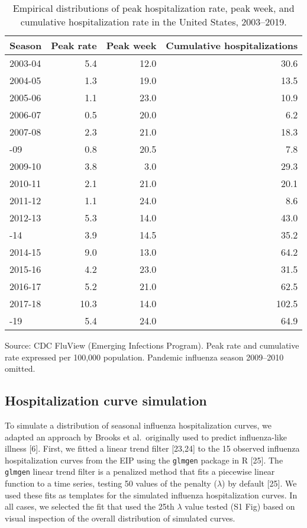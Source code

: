 \documentclass[10pt,letterpaper]{article}
\begin{document}
\begin{table}

\caption{\label{tab:target-table}Empirical distributions of peak hospitalization rate, peak week, and cumulative hospitalization rate in the United States, 2003--2019.}
\centering
\begin{threeparttable}
\begin{tabular}[t]{lrrr}
\toprule
Season & Peak rate & Peak week & Cumulative hospitalizations\\
\midrule
2003-04 & 5.4 & 12.0 & 30.6\\
2004-05 & 1.3 & 19.0 & 13.5\\
2005-06 & 1.1 & 23.0 & 10.9\\
2006-07 & 0.5 & 20.0 & 6.2\\
2007-08 & 2.3 & 21.0 & 18.3\\
\addlinespace
2008-09 & 0.8 & 20.5 & 7.8\\
2009-10 & 3.8 & 3.0 & 29.3\\
2010-11 & 2.1 & 21.0 & 20.1\\
2011-12 & 1.1 & 24.0 & 8.6\\
2012-13 & 5.3 & 14.0 & 43.0\\
\addlinespace
2013-14 & 3.9 & 14.5 & 35.2\\
2014-15 & 9.0 & 13.0 & 64.2\\
2015-16 & 4.2 & 23.0 & 31.5\\
2016-17 & 5.2 & 21.0 & 62.5\\
2017-18 & 10.3 & 14.0 & 102.5\\
\addlinespace
2018-19 & 5.4 & 24.0 & 64.9\\
\bottomrule
\end{tabular}
\begin{tablenotes}
\item Source: CDC FluView (Emerging Infections Program). Peak rate and cumulative rate expressed per 100,000 population. Pandemic influenza season 2009--2010 omitted.
\end{tablenotes}
\end{threeparttable}
\end{table}

\hypertarget{hospitalization-curve-simulation}{%
\subsection{Hospitalization curve
simulation}\label{hospitalization-curve-simulation}}

To simulate a distribution of seasonal influenza hospitalization curves,
we adapted an approach by Brooks et al.~originally used to predict
influenza-like illness {[}6{]}. First, we fitted a linear trend filter
{[}23,24{]} to the 15 observed influenza hospitalization curves from the
EIP using the \texttt{glmgen} package in R {[}25{]}. The \texttt{glmgen}
linear trend filter is a penalized method that fits a piecewise linear
function to a time series, testing 50 values of the penalty
(\(\lambda\)) by default {[}25{]}. We used these fits as templates for
the simulated influenza hospitalization curves. In all cases, we
selected the fit that used the 25th \(\lambda\) value tested (S1 Fig)
based on visual inspection of the overall distribution of simulated
curves.
\end{document}
